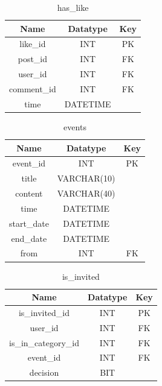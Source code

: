 \begin{table}[!ht]
\caption{has\_like}
\centering
\begin{tabular}{c c c}
\hline\hline
Name               & Datatype    & Key \\
\hline
like\_id           & INT          & PK  \\
post\_id           & INT          & FK  \\
user\_id           & INT          & FK  \\
comment\_id        & INT          & FK  \\
time               & DATETIME     &     \\
\hline
\end{tabular}
\label{table:nonlin}
\end{table}

\begin{table}[!ht]
\caption{events}
\centering
\begin{tabular}{c c c}
\hline\hline
Name                    & Datatype    & Key \\
\hline
event\_id               & INT          & PK  \\
title                   & VARCHAR(10)  &     \\
content                 & VARCHAR(40)  &     \\
time                    & DATETIME     & \\
start\_date             & DATETIME     & \\
end\_date               & DATETIME     & \\
from                    & INT          & FK  \\
\hline
\end{tabular}
\label{table:nonlin}
\end{table}

\begin{table}[!ht]
\caption{is\_invited}
\centering
\begin{tabular}{c c c}
\hline\hline
Name                    & Datatype    & Key \\
\hline
is\_invited\_id         & INT         & PK  \\
user\_id                & INT         & FK  \\
is\_in\_category\_id    & INT         & FK  \\
event\_id               & INT         & FK  \\
decision                & BIT         &     \\
\hline
\end{tabular}
\label{table:nonlin}
\end{table}

